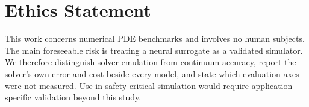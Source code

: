 \documentclass{article}
\begin{document}
\section*{Ethics Statement}
This work concerns numerical PDE benchmarks and involves no human subjects. The main
foreseeable risk is treating a neural surrogate as a validated simulator. We therefore
distinguish solver emulation from continuum accuracy, report the solver's own error and
cost beside every model, and state which evaluation axes were not measured. Use in
safety-critical simulation would require application-specific validation beyond this
study.


\clearpage

\end{document}
